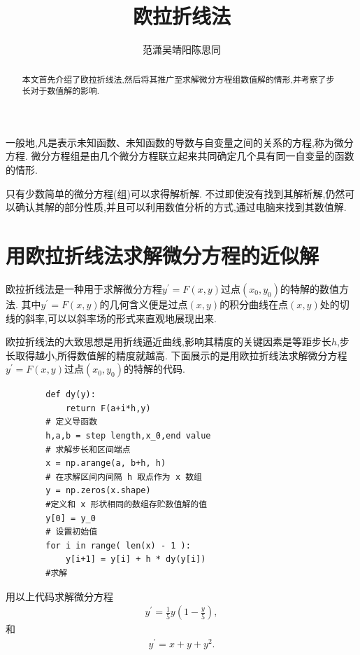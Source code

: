 \documentclass[a4paper]{article}%
\title{欧拉折线法}%
\author{范潇\phantom{1}吴靖阳\phantom{1}陈思同}%
\date{}%
\begin{document}
  \maketitle  
\begin{abstract}
本文首先介绍了欧拉折线法,然后将其推广至求解微分方程组数值解的情形,并考察了步长对于数值解的影响.
\end{abstract}


一般地,凡是表示未知函数、未知函数的导数与自变量之间的关系的方程,称为微分方程.
微分方程组是由几个微分方程联立起来共同确定几个具有同一自变量的函数的情形.


只有少数简单的微分方程(组)可以求得解析解.
不过即使没有找到其解析解,仍然可以确认其解的部分性质,并且可以利用数值分析的方式,通过电脑来找到其数值解.
\section{用欧拉折线法求解微分方程的近似解}
欧拉折线法是一种用于求解微分方程$y^{\prime}=F(x,y)$过点$(x_0,y_0)$的特解的数值方法.
其中$y^{\prime}=F(x,y)$的几何含义便是过点$(x,y)$的积分曲线在点$(x,y)$处的切线的斜率,可以以斜率场的形式来直观地展现出来.


欧拉折线法的大致思想是用折线逼近曲线,影响其精度的关键因素是等距步长$h$,步长取得越小,所得数值解的精度就越高.
下面展示的是用欧拉折线法求解微分方程$y^{\prime}=F(x,y)$过点$(x_0,y_0)$的特解的代码.
\begin{verbatim}
        def dy(y):
            return F(a+i*h,y)
        # 定义导函数    
        h,a,b = step length,x_0,end value 
        # 求解步长和区间端点
        x = np.arange(a, b+h, h)
        # 在求解区间内间隔 h 取点作为 x 数组
        y = np.zeros(x.shape)
        #定义和 x 形状相同的数组存贮数值解的值
        y[0] = y_0 
        # 设置初始值
        for i in range( len(x) - 1 ):
            y[i+1] = y[i] + h * dy(y[i])
        #求解
 \end{verbatim}


用以上代码求解微分方程
\begin{gather}
    y^{\prime}=\frac{1}{5}y(1-\frac{y}{5}),
    \end{gather}
和
\begin{gather}
    y^{\prime}=x+y+y^2.
    \end{gather}
\end{document}
